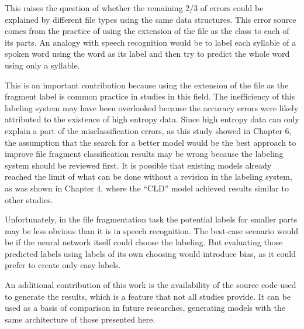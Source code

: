 This raises the question of whether the remaining 2/3 of errors could be explained by different file types using the same data structures. This error source comes from the practice of using the extension of the file as the class to each of its parts. An analogy with speech recognition would be to label each syllable of a spoken word using the word as its label and then try to predict the whole word using only a syllable.

This is an important contribution because using the extension of the file as the fragment label is common practice in studies in this field. The inefficiency of this labeling system may have been overlooked because the accuracy errors were likely attributed to the existence of high entropy data. Since high entropy data can only explain a part of the misclassification errors, as this study showed in Chapter 6, the assumption that the search for a better model would be the best approach to improve file fragment classification results may be wrong because the labeling system should be reviewed first. It is possible that existing models already reached the limit of what can be done without a revision in the labeling system, as was shown in Chapter 4, where the ``CLD'' model achieved results similar to other studies.

Unfortunately, in the file fragmentation task the potential labels for smaller parts may be less obvious than it is in speech recognition. The best-case scenario would be if the neural network itself could choose the labeling. But evaluating those predicted labels using labels of its own choosing would introduce bias, as it could prefer to create only easy labels.

An additional contribution of this work is the availability of the source code used to generate the results, which is a feature that not all studies provide. It can be used as a basis of comparison in future researches, generating models with the same architecture of those presented here.
